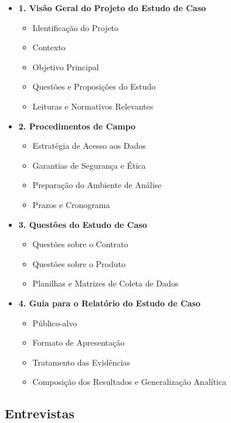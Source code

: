 \begin{itemize}
    \item \textbf{1. Visão Geral do Projeto do Estudo de Caso}
    \begin{itemize}
        \item Identificação do Projeto
        \item Contexto
        \item Objetivo Principal
        \item Questões e Proposições do Estudo
        \item Leituras e Normativos Relevantes
    \end{itemize}

    \item \textbf{2. Procedimentos de Campo}
    \begin{itemize}
        \item Estratégia de Acesso aos Dados
        \item Garantias de Segurança e Ética
        \item Preparação do Ambiente de Análise
        \item Prazos e Cronograma
    \end{itemize}

    \item \textbf{3. Questões do Estudo de Caso}
    \begin{itemize}
        \item Questões sobre o Contrato
        \item Questões sobre o Produto
        \item Planilhas e Matrizes de Coleta de Dados
    \end{itemize}

    \item \textbf{4. Guia para o Relatório do Estudo de Caso}
    \begin{itemize}
        \item Público-alvo
        \item Formato de Apresentação
        \item Tratamento das Evidências
        \item Composição dos Resultados e Generalização Analítica
    \end{itemize}
\end{itemize}

\subsection{Entrevistas}


